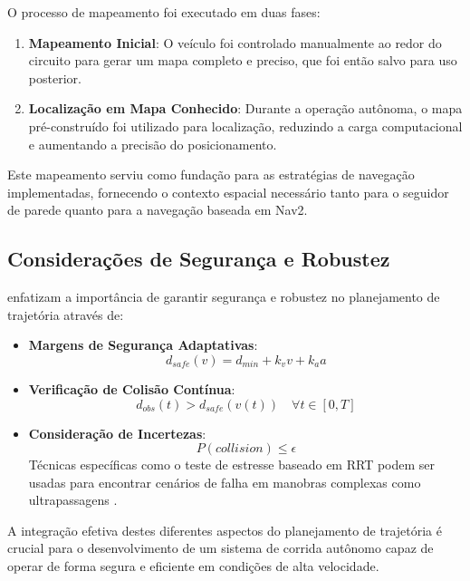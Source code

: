 O processo de mapeamento foi executado em duas fases:

\begin{enumerate}
    \item \textbf{Mapeamento Inicial}: O veículo foi controlado manualmente ao redor do circuito para gerar um mapa completo e preciso, que foi então salvo para uso posterior.

    \item \textbf{Localização em Mapa Conhecido}: Durante a operação autônoma, o mapa pré-construído foi utilizado para localização, reduzindo a carga computacional e aumentando a precisão do posicionamento.
\end{enumerate}

Este mapeamento serviu como fundação para as estratégias de navegação
implementadas, fornecendo o contexto espacial necessário tanto para o seguidor
de parede quanto para a navegação baseada em Nav2.

\subsection{Considerações de Segurança e Robustez}

\cite{Ivanov2020Verifying} enfatizam a importância de garantir segurança e robustez no planejamento de trajetória através de:

\begin{itemize}
    \item \textbf{Margens de Segurança Adaptativas}:
          \begin{equation}
              d_{safe}(v) = d_{min} + k_v v + k_a a
              \label{eq:adaptive_safety_margin}
          \end{equation}

    \item \textbf{Verificação de Colisão Contínua}:
          \begin{equation}
              d_{obs}(t) > d_{safe}(v(t)) \quad \forall t \in [0,T]
              \label{eq:collision_check}
          \end{equation}

    \item \textbf{Consideração de Incertezas}:
          \begin{equation}
              P(collision) \leq \epsilon
              \label{eq:collision_probability}
          \end{equation}
          Técnicas específicas como o teste de estresse baseado em RRT podem ser usadas para encontrar cenários de falha em manobras complexas como ultrapassagens \cite{Bak2021Stress}.
\end{itemize}

A integração efetiva destes diferentes aspectos do planejamento de trajetória é
crucial para o desenvolvimento de um sistema de corrida autônomo capaz de
operar de forma segura e eficiente em condições de alta velocidade.

